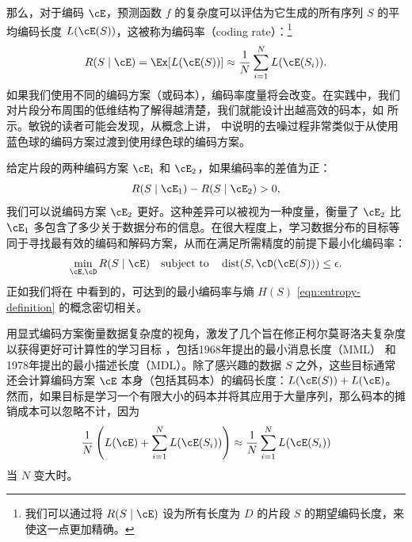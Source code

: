 \documentclass[../../book-main_zh.tex]{subfiles}
\begin{document}
那么，对于编码 \(\cE\)，预测函数 \(f\) 的复杂度可以评估为它生成的所有序列 \(S\) 的平均编码长度
\(L(\cE(S))\)，这被称为编码率（coding rate）：\footnote{我们可以通过将 \(R(S \mid
\cE)\) 设为所有长度为 \(D\) 的片段 \(S\) 的期望编码长度，来使这一点更加精确。}
\begin{equation}
    R(S \mid \cE) = \Ex[L(\cE(S))] \approx \frac{1}{N}\sum_{i=1}^{N}
    L(\cE(S_{i})).
    \label{eqn:coding-rate}
\end{equation}
如果我们使用不同的编码方案（或码本），编码率度量将会改变。在实践中，我们对片段分布周围的低维结构了解得越清楚，我们就能设计出越高效的码本，如
 所示。敏锐的读者可能会发现，从概念上讲，
中说明的去噪过程非常类似于从使用蓝色球的编码方案过渡到使用绿色球的编码方案。

给定片段的两种编码方案 \(\cE_{1}\) 和 \(\cE_{2}\)，如果编码率的差值为正：
\begin{equation}
    R(S \mid \cE_{1}) -  R(S \mid \cE_{2}) > 0,
\end{equation}
我们可以说编码方案 \(\cE_{2}\) 更好。这种差异可以被视为一种度量，衡量了 \(\cE_{2}\) 比 \(\cE_{1}\)
多包含了多少关于数据分布的信息。在很大程度上，学习数据分布的目标等同于寻找最有效的编码和解码方案，从而在满足所需精度的前提下最小化编码率：
\begin{equation}
    \min_{\cE, \cD} R(S \mid \cE) \quad \text{subject to} \quad
    \operatorname{dist}(S, \cD(\cE(S))) \leq \epsilon.
\end{equation}
正如我们将在  中看到的，可达到的最小编码率与熵 \(H(S)\)
\eqref{eqn:entropy-definition} 的概念密切相关。

\begin{remark}\label{rem:computable-complexity}
    用显式编码方案衡量数据复杂度的视角，激发了几个旨在修正柯尔莫哥洛夫复杂度以获得更好可计算性的学习目标
    \cite{WallaceC1999}，包括1968年提出的最小消息长度（MML）\cite{WallaceC1968}
    和1978年提出的最小描述长度（MDL）\cite{Rissanen-1978,HansenM2001}。除了感兴趣的数据
    \(S\) 之外，这些目标通常还会计算编码方案 \(\cE\) 本身（包括其码本）的编码长度：\(L(\cE(S)) +
    L(\cE)\)。然而，如果目标是学习一个有限大小的码本并将其应用于大量序列，那么码本的摊销成本可以忽略不计，因为
    \begin{equation}
        \frac{1}{N}\left( L(\cE) + \sum_{i=1}^{N}
        L(\cE(S_{i}))\right) \approx \frac{1}{N}\sum_{i=1}^{N} L(\cE(S_{i}))
    \end{equation}
    当 \(N\) 变大时。
\end{remark}
\end{document}

